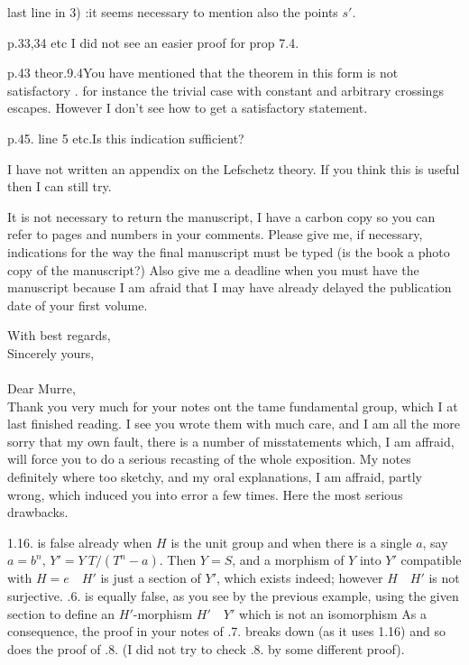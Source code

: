 last line in 3) :\quad it seems necessary to mention also the points $s'$.

p.33,34 etc \quad I did not see an easier proof for prop 7.4.

p.43 theor.9.4\quad You have mentioned that the theorem in this form is not satisfactory . for instance the trivial case with constant  and arbitrary crossings escapes. However I don't see how to get a satisfactory statement.

p.45. line 5 etc.\quad Is this indication sufficient?

I have not written an appendix on the Lefschetz theory. If you think this is useful then I can still try.

It is not necessary to return the manuscript, I have a carbon copy so you can refer to pages and numbers in your comments. Please give me, if necessary, indications for the way the final manuscript must be typed (is the book a  photo copy of the manuscript?) Also give me a deadline when you must have the manuscript because I am afraid that I may have already delayed the publication date of your first volume.

With best regards,\\
Sincerely yours,\\
\\
Dear Murre,\\

Thank you very much for your notes ont the tame fundamental group, which I at last finished reading. I see you wrote them with much care, and I am all the more sorry that  my own fault, there is a number of misstatements which, I am affraid, will force you to do a serious recasting of the whole exposition. My notes definitely where too sketchy, and my oral explanations, I am affraid, partly wrong, which induced you into error a few times. Here the most serious drawbacks.

1.16. is false already when $H$ is the unit group and when there is a single $a$, say $a=b^n$, $Y'=Y\ T/(T^n-a)$. Then $Y=S$, and a morphism of $Y$ into $Y'$ compatible with $H=e\quad H'$ is just a section of $Y'$, which exists indeed; however $H\quad H'$ is not surjective. .6. is equally false, as you see by the previous example, using the given section to define an $H'$-morphism $H'\quad Y'$ which is not an isomorphism\handwritten{!} As a consequence, the proof in your notes of .7. breaks down (as it uses 1.16) and so does the proof of .8. (I did not try to check .8. by some different proof).

